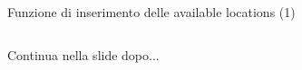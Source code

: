 \documentclass[xcolor=svgnames, aspectratio=169]{beamer}
\begin{document}
\begin{frame}{Funzione di inserimento delle available locations (1)}
    \begin{columns}[t]
        Continua nella slide dopo...
        
        \vspace*{-32pt}
        \begin{figure}[H]
            \centering
            \noindent{}
        \end{figure}
    \end{columns}
\end{frame}

\end{document}
